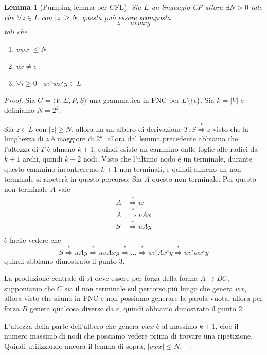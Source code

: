 \documentclass[12pt]{report}
\newtheorem{lemma}{Lemma}
\begin{document}
\begin{lemma}[Pumping lemma per CFL]
	Sia $L$ un linguagio CF allora $\exists N > 0$ tale che $\forall z \in L$ con $|z| \geq N$, questa può essere scomposta
	$$ z = uvwxy $$
	tali che
	\begin{enumerate}
		\item $vwx| \leq N $
		\item $vx \neq \epsilon $
		\item $\forall i \geq 0 \mid uv^i w x^i y \in L$
	\end{enumerate}
\end{lemma}
\begin{proof}
	Sia $G = \langle V, \Sigma, P, S \rangle$ una grammatica in FNC per $L \setminus \{ \epsilon \}$.
	Sia $k = | V | $ e definiamo $N = 2^k$.

	Sia $z \in L$ con $|z| \geq N$, allora ha un albero di derivazione $T : S \overset{*}{\Rightarrow} z$
	visto che la lunghezza di $z$ è maggiore di $2^k$, allora dal lemma precedente abbiamo che l'altezza di $T$ è almeno $k + 1$, quindi esiste un cammino dalle foglie alle radici da $k + 1$ archi, quindi $k + 2$ nodi.
	Visto che l'ultimo nodo è un terminale, durante questo cammino incontreremo $k + 1$ non terminali, e quindi almeno un non terminale si ripeterà in questo percorso.
	Sia $A$ questo non terminale.
	Per questo non terminale $A$ vale
	\begin{align*}
		A &\overset{*}{\Rightarrow} w \\
		A &\overset{*}{\Rightarrow} v A x \\
		S &\overset{*}{\Rightarrow} u A y \\
	\end{align*}
	è facile vedere che 
	$$ S \overset{*}{\Rightarrow} u A y \overset{*}{\Rightarrow} u v A x y \overset{*}{\Rightarrow} \dots \overset{*}{\Rightarrow} u v^i A x^i y \overset{*}{\Rightarrow} u v^i w x^i y $$
	quindi abbiamo dimostrato il punto 3.

	La produzione centrale di $A$ deve essere per forza della forma $A \rightarrow B C$, supponiamo che $C$ sia il non terminale sul percorso più lungo che genera $w x$, allora visto che siamo in FNC e non possiamo generare la parola vuota, allora per forza $B$ genera qualcosa diverso da $\epsilon$, quindi abbiamo dimostrato il punto 2.

	L'altezza della parte dell'albero che genera $vwx$ è al massimo $k + 1$, cioè il numero massimo di nodi che possiamo vedere prima di trovare una ripetizione.
	Quindi utilizzando ancora il lemma di sopra, $|vwx| \leq N$.
\end{proof}
\end{document}
